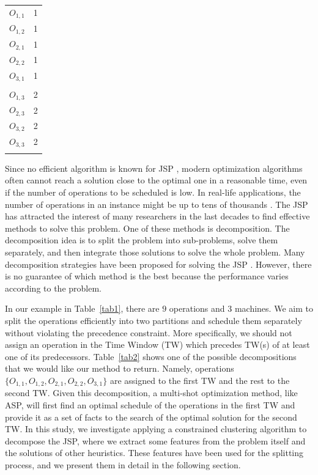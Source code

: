 \documentclass[runningheads]{llncs}
\begin{document}
\begin{table}
\begin{minipage}{.4\textwidth}
\begin{tabular}{c  c }
							\\
      $O_{1,1}$  & 1    	\\
      $O_{1,2}$  & 1    	\\
      $O_{2,1}$  & 1    	\\
      $O_{2,2}$  & 1   	\\
      $O_{3,1}$  & 1		\\
					    		\\
      $O_{1,3}$  & 2  	\\
      $O_{2,3}$  & 2		\\
      $O_{3,2}$  & 2    	\\
      $O_{3,3}$  & 2    	\\
      \\
    \end{tabular}
\end{minipage}
\end{table}

Since no efficient algorithm is known for JSP \cite{garey1976complexity}, 
modern optimization algorithms often cannot reach a solution close to the optimal one in a reasonable time, even if the number of operations to be scheduled is low. In real-life applications, the number of operations in an instance might be up to tens of thousands \cite{zhang2010hybrid}. The JSP has attracted the interest of many researchers in the last decades to find effective methods to solve this problem. One of these methods is decomposition. The decomposition idea is to split the problem into sub-problems, solve them separately, and then integrate those solutions to solve the whole problem. Many decomposition strategies have been proposed for solving the JSP  \cite{zhai2014decomposition,singer2001decomposition,ovacik2012decomposition,uzsoy2000performance}. However, there is no guarantee of which method is the best because the performance varies according to the problem.

In our example in Table~\ref{tab1}, there are $9$ operations and $3$ machines. We aim to split the operations efficiently into two partitions and schedule them separately without violating the precedence constraint. More specifically, we should not assign an operation in the Time Window (TW) which precedes TW(s) of at least one of its predecessors. Table~\ref{tab2} shows one of the possible decompositions that we would like our method to return. Namely, operations $\{ O_{1,1}, O_{1,2}, O_{2,1}, O_{2,2}, O_{3,1} \}$ are assigned to the first TW and the rest to the second TW. Given this decomposition, a multi-shot optimization method, like ASP, will first find an optimal schedule of the operations in the first TW and provide it as a set of facts to the search of the optimal solution for the second TW. In this study, we investigate applying a constrained clustering algorithm to decompose the JSP, where we extract some features from the problem itself and the solutions of other heuristics. These features have been used for the splitting process, and we present them in detail in the following section.
\end{document}
